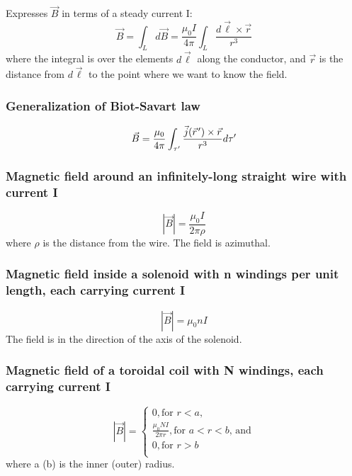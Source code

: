 \documentclass[english,11pt]{article}
\newcommand{\pvec}[1]{\vec{#1}\mkern2mu\vphantom{#1}}
\begin{document}
Expresses $\vec{B}$ in terms of a steady current I:
\begin{equation*}
  \vec{B} = \int_{L} d\vec{B}
      = \frac{\mu_0I}{4\pi} \int_{L} \frac{d\vec{\ell} \times \vec{r}}{r^3}
\end{equation*}
where the integral is over the elements $d\vec{\ell}$ along the conductor, and $\vec{r}$
is the distance from $d\vec{\ell}$ to the point where we want to know the field.

\subsubsection*{\bf Generalization of Biot-Savart law}

\begin{equation*}
    \vec{B} =
      \frac{\mu_0}{4\pi} \int_{\tau^{\prime}}
         \frac{\vec{j}(\pvec{r}') \times \vec{r}}{r^{3}} d\tau^{\prime}
\end{equation*}


\subsubsection*{\bf Magnetic field around an infinitely-long straight wire with current I}
\begin{equation*}
      |\vec{B}| = \frac{\mu_0I}{2\pi \rho}
\end{equation*}
where $\rho$ is the distance from the wire.
The field is azimuthal.

\subsubsection*{\bf Magnetic field inside a solenoid with n windings per unit length, each carrying current I}
\begin{equation*}
      |\vec{B}| = \mu_0 n I
\end{equation*}
The field is in the direction of the axis of the solenoid.

\subsubsection*{\bf Magnetic field of a toroidal coil with N windings, each carrying current I}

\begin{equation*}
  |\vec{B}| = \left\{ \begin{array}{l}
         0, \text{for $r < a$,} \\
         \frac{\mu_0 N I}{2\pi r}, \text{for $a < r < b$, and} \\
         0, \text{for $r > b$} \\
    \end{array} \right.
\end{equation*}
where a (b) is the inner (outer) radius.
\end{document}
